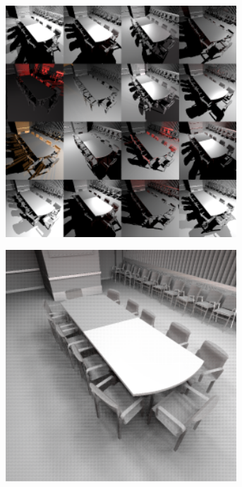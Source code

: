 \begin{figure}[htb]
\begin{subfigure}[b]{0.33\textwidth}
    \caption{}
    \label{fig:concept:interleaved_segovia_2}
  \end{subfigure}%
  \begin{subfigure}[b]{0.33\textwidth}
    \centering
    \includegraphics[width=0.95\textwidth]{graphics/interleaved_segovia_3}
    \caption{}
    \label{fig:concept:interleaved_segovia_3}
  \end{subfigure}
  \begin{subfigure}[b]{0.33\textwidth}
    \centering
    \includegraphics[width=0.95\textwidth]{graphics/interleaved_segovia_4}

\end{subfigure}
\end{figure}
